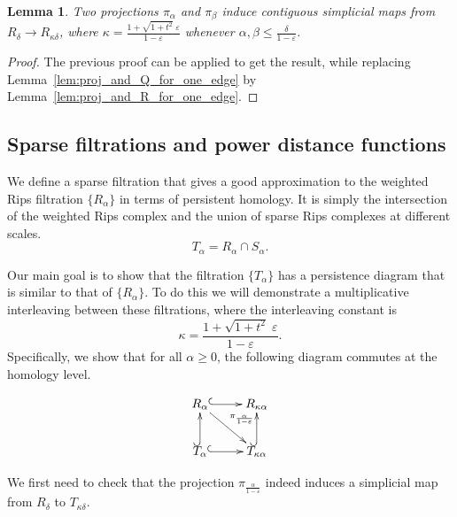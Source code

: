 \documentclass[a4paper]{article}
\newtheorem{lemma}[theorem]{Lemma}
\newcommand{\e}{\varepsilon}
\newcommand{\proj}{\pi}
\begin{document}
  \begin{lemma}\label{lem:proj_and_R}
    Two projections $\proj_\alpha$ and $\proj_\beta$ induce contiguous simplicial maps from $R_\delta\to R_{\kappa\delta}$, where $\kappa = \frac{1 + \sqrt{1+t^2}\;\e}{1-\e}$ whenever $\alpha,\beta \le \frac{\delta}{1-\e}$.    
  \end{lemma}
  
\begin{proof}
The previous proof can be applied to get the result, while replacing Lemma~\ref{lem:proj_and_Q_for_one_edge} by Lemma~\ref{lem:proj_and_R_for_one_edge}.
\end{proof}



%
 
\subsection{Sparse filtrations and power distance functions} \label{sec:rips_interleaving}


We define a sparse filtration that gives a good approximation to the weighted Rips filtration $\{R_\alpha\}$ in terms of persistent homology.
  It is simply the intersection of the weighted Rips complex and the union of sparse Rips complexes at different scales.
  \[
    T_\alpha = R_\alpha \cap S_\alpha.
  \]

  Our main goal is to show that the filtration $\{T_\alpha\}$ has a persistence diagram that is similar to that of $\{R_\alpha\}$.
  To do this we will demonstrate a multiplicative interleaving between these filtrations, where the interleaving constant is 
  \[
    \kappa =\frac{1 + \sqrt{1+t^2}\;\e}{1-\e}.
  \]
  Specifically, we show that for all $\alpha\ge 0$, the following diagram commutes at the homology level. 
  
  \[
    \xymatrix{
      R_{\alpha} \ar[dr]^{\proj_{\frac{\alpha}{1-\e}}} \ar@{^{(}->}[r] & R_{\kappa\alpha} \\
      T_{\alpha} \ar@{^{(}->}[r] \ar@{^{(}->}[u] & T_{\kappa\alpha} \ar@{^{(}->}[u]
    }
  \]

  We first need to check that the projection $\proj_{\frac{\alpha}{1-\e}}$ indeed induces a simplicial map from $R_\delta$ to $T_{\kappa\delta}$.
\end{document}
